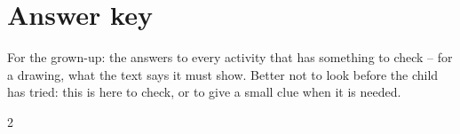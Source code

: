 \section*{Answer key}

For the grown-up: the answers to every activity that has something to
check -- for a drawing, what the text says it must show. Better not to
look before the child has tried: this is here to check, or to give a
small clue when it is needed.

\begin{multicols}{2}
\footnotesize
\begin{itemize}[leftmargin=0mm, label={}, itemsep=2mm, topsep=0mm]

\end{itemize}
\end{multicols}
\newpage
